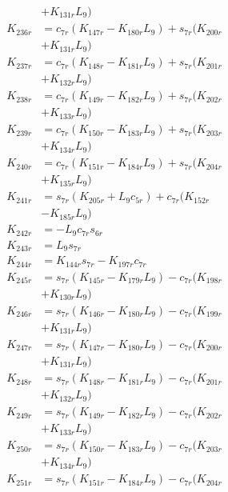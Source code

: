 \begin{multicols}{2}
\begin{align}
&+ K_{131r}L_9) \nonumber \\
K_{236r} &= c_{7r}(K_{147r} - K_{180r}L_9) + s_{7r}(K_{200r}  \nonumber \\
&+ K_{131r}L_9) \nonumber \\
K_{237r} &= c_{7r}(K_{148r} - K_{181r}L_9) + s_{7r}(K_{201r}  \nonumber \\
&+ K_{132r}L_9) \nonumber \\
K_{238r} &= c_{7r}(K_{149r} - K_{182r}L_9) + s_{7r}(K_{202r}  \nonumber \\
&+ K_{133r}L_9) \nonumber \\
K_{239r} &= c_{7r}(K_{150r} - K_{183r}L_9) + s_{7r}(K_{203r}  \nonumber \\
&+ K_{134r}L_9) \nonumber \\
K_{240r} &= c_{7r}(K_{151r} - K_{184r}L_9) + s_{7r}(K_{204r}  \nonumber \\
&+ K_{135r}L_9) \nonumber \\
K_{241r} &= s_{7r}(K_{205r} + L_9c_{5r}) + c_{7r}(K_{152r}  \nonumber \\
&- K_{185r}L_9) \nonumber \\
K_{242r} &= -L_9c_{7r}s_{6r} \nonumber \\
K_{243r} &= L_9s_{7r} \nonumber \\
K_{244r} &= K_{144r}s_{7r} - K_{197r}c_{7r} \nonumber \\
K_{245r} &= s_{7r}(K_{145r} - K_{179r}L_9) - c_{7r}(K_{198r}  \nonumber \\
&+ K_{130r}L_9) \nonumber \\
K_{246r} &= s_{7r}(K_{146r} - K_{180r}L_9) - c_{7r}(K_{199r}  \nonumber \\
&+ K_{131r}L_9) \nonumber \\
K_{247r} &= s_{7r}(K_{147r} - K_{180r}L_9) - c_{7r}(K_{200r}  \nonumber \\
&+ K_{131r}L_9) \nonumber \\
K_{248r} &= s_{7r}(K_{148r} - K_{181r}L_9) - c_{7r}(K_{201r}  \nonumber \\
&+ K_{132r}L_9) \nonumber \\
K_{249r} &= s_{7r}(K_{149r} - K_{182r}L_9) - c_{7r}(K_{202r}  \nonumber \\
&+ K_{133r}L_9) \nonumber \\
K_{250r} &= s_{7r}(K_{150r} - K_{183r}L_9) - c_{7r}(K_{203r}  \nonumber \\
&+ K_{134r}L_9) \nonumber \\
K_{251r} &= s_{7r}(K_{151r} - K_{184r}L_9) - c_{7r}(K_{204r}  \nonumber \\

\end{align}
\end{multicols}
